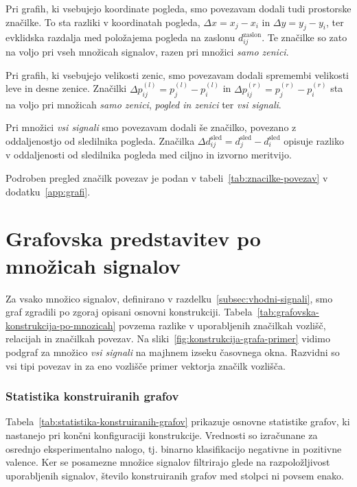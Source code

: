 Pri grafih, ki vsebujejo koordinate pogleda, smo povezavam dodali tudi prostorske značilke.
To sta razliki v koordinatah pogleda, $\Delta x = x_j - x_i$ in $\Delta y = y_j - y_i$, ter evklidska razdalja med položajema pogleda na zaslonu $d_{ij}^{\text{zaslon}}$.
Te značilke so zato na voljo pri vseh množicah signalov, razen pri množici \emph{samo zenici}.

Pri grafih, ki vsebujejo velikosti zenic, smo povezavam dodali spremembi velikosti leve in desne zenice.
Značilki $\Delta p^{(l)}_{ij} = p_j^{(l)} - p_i^{(l)}$ in $\Delta p^{(r)}_{ij} = p_j^{(r)} - p_i^{(r)}$ sta na voljo pri množicah \emph{samo zenici}, \emph{pogled in zenici} ter \emph{vsi signali}.

Pri množici \emph{vsi signali} smo povezavam dodali še značilko, povezano z oddaljenostjo od sledilnika pogleda.
Značilka $\Delta d_{ij}^{\text{sled}} = d_j^{\text{sled}} - d_i^{\text{sled}}$ opisuje razliko v oddaljenosti od sledilnika pogleda med ciljno in izvorno meritvijo.

Podroben pregled značilk povezav je podan v tabeli~\ref{tab:znacilke-povezav} v dodatku~\ref{app:grafi}.


\section{Grafovska predstavitev po množicah signalov}
\label{subsec:grafovska-konstrukcija-po-mnozicah}


Za vsako množico signalov, definirano v razdelku~\ref{subsec:vhodni-signali}, smo graf zgradili po zgoraj opisani osnovni konstrukciji. Tabela~\ref{tab:grafovska-konstrukcija-po-mnozicah} povzema razlike v uporabljenih značilkah vozlišč, relacijah in značilkah povezav.
Na sliki~\ref{fig:konstrukcija-grafa-primer} vidimo podgraf za množico \emph{vsi signali} na majhnem izseku časovnega okna.
Razvidni so vsi tipi povezav in za eno vozlišče primer vektorja značilk vozlišča.
\newpage




\subsubsection*{Statistika konstruiranih grafov}

Tabela~\ref{tab:statistika-konstruiranih-grafov} prikazuje osnovne statistike grafov, ki nastanejo pri končni konfiguraciji konstrukcije.
Vrednosti so izračunane za osrednjo eksperimentalno nalogo, tj. binarno klasifikacijo negativne in pozitivne valence.
Ker se posamezne množice signalov filtrirajo glede na razpoložljivost uporabljenih signalov, število konstruiranih grafov med stolpci ni povsem enako.

